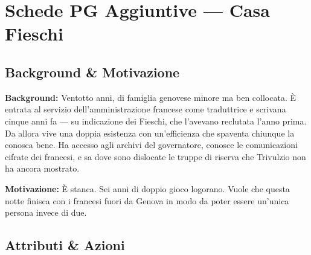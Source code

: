 
\chapter{Schede PG Aggiuntive --- Casa Fieschi}



\section*{Background \& Motivazione}

\begin{rulebox}{}
  \textbf{Background:} Ventotto anni, di famiglia genovese minore ma ben collocata.
  È entrata al servizio dell'amministrazione francese come traduttrice e scrivana
  cinque anni fa — su indicazione dei Fieschi, che l'avevano reclutata l'anno prima.
  Da allora vive una doppia esistenza con un'efficienza che spaventa chiunque la
  conosca bene. Ha accesso agli archivi del governatore, conosce le comunicazioni
  cifrate dei francesi, e sa dove sono dislocate le truppe di riserva che
  Trivulzio non ha ancora mostrato.

  \medskip\noindent\textcolor{FieschiGreen}{\textbf{Motivazione:}} È stanca. Sei
  anni di doppio gioco logorano. Vuole che questa notte finisca con i francesi
  fuori da Genova in modo da poter essere un'unica persona invece di due.
\end{rulebox}

\section*{Attributi \& Azioni}


